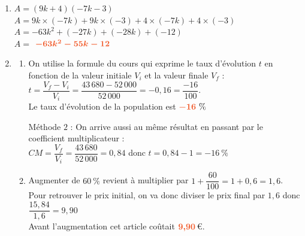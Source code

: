 \documentclass[a4paper,11pt]{article}
\begin{document}
\begin{seanceD}{}
\begin{enumerate}
\item  $A =  (9k+4)(-7k-3)$ \\$A =  9k\times (-7k) + 
  9k\times (-3) +
  4 \times (-7k)  +
  4 \times (-3)$ \\$A = -63k^2 + 
  (-27k) +
  (-28k) +
  (-12)$ \\$A =$ ${\color[HTML]{f15929}\boldsymbol{ -63k^2-55k-12 }}$


\item \begin{enumerate}
\item On utilise la formule du cours qui exprime le taux d'évolution $t$ en fonction de la valeur initiale $V_i$ et la valeur finale $V_f$ : $t=\dfrac{V_f-V_i}{V_i}=\dfrac{43\,680-52\,000}{52\,000}=-0{,}16=\dfrac{-16}{100}$.\\Le taux d'évolution de la population est ${\color[HTML]{f15929}\boldsymbol{-16}}~\%$

\medskip
Méthode $2$ : On arrive aussi au même résultat en passant par le coefficient multiplicateur : \\$CM=\dfrac{V_f}{V_i}=\dfrac{43\,680}{52\,000} = 0{,}84$ donc $t = 0{,}84-1= -16~\%$
\item Augmenter de $60~\%$ revient à multiplier par $1 + \dfrac{60}{100} = 1+ 0{,}6 = 1{,}6$.\\Pour retrouver le prix initial, on va donc diviser le prix final par $1{,}6$ donc $\dfrac{15{,}84}{1{,}6}  = 9{,}90$\\Avant l'augmentation cet article coûtait ${\color[HTML]{f15929}\boldsymbol{9{,}90}}$\,\euro{}.
\end{enumerate}



\end{enumerate}
\end{seanceD}
\end{document}
